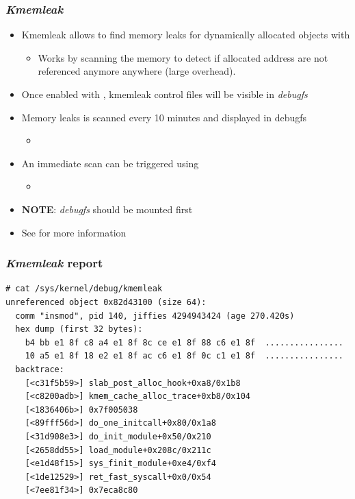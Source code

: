 \begin{frame}
  \frametitle{{\em Kmemleak}}
  \begin{itemize}
    \item Kmemleak allows to find memory leaks for dynamically allocated objects
          with 
    \begin{itemize}
      \item Works by scanning the memory to detect if allocated address are not
            referenced anymore anywhere (large overhead).
    \end{itemize}
    \item Once enabled with , kmemleak control
          files will be visible in {\em debugfs}
    \item Memory leaks is scanned every 10 minutes and displayed in debugfs
    \begin{itemize}
      \item {}
    \end{itemize}
    \item An immediate scan can be triggered using 
    \begin{itemize}
      \item {}
    \end{itemize}
    \item {\bf NOTE}: {\em debugfs} should be mounted first
    \item See  for more information
  \end{itemize}
\end{frame}

\begin{frame}[fragile]
  \frametitle{{\em Kmemleak} report}
  \begin{block}{}
    \begin{verbatim}
# cat /sys/kernel/debug/kmemleak
unreferenced object 0x82d43100 (size 64):
  comm "insmod", pid 140, jiffies 4294943424 (age 270.420s)
  hex dump (first 32 bytes):
    b4 bb e1 8f c8 a4 e1 8f 8c ce e1 8f 88 c6 e1 8f  ................
    10 a5 e1 8f 18 e2 e1 8f ac c6 e1 8f 0c c1 e1 8f  ................
  backtrace:
    [<c31f5b59>] slab_post_alloc_hook+0xa8/0x1b8
    [<c8200adb>] kmem_cache_alloc_trace+0xb8/0x104
    [<1836406b>] 0x7f005038
    [<89fff56d>] do_one_initcall+0x80/0x1a8
    [<31d908e3>] do_init_module+0x50/0x210
    [<2658dd55>] load_module+0x208c/0x211c
    [<e1d48f15>] sys_finit_module+0xe4/0xf4
    [<1de12529>] ret_fast_syscall+0x0/0x54
    [<7ee81f34>] 0x7eca8c80
    \end{verbatim}
  \end{block}
\end{frame}

